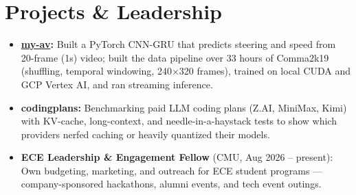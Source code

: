 \documentclass[11pt, letterpaper]{article}
\begin{document}
\section{Projects \& Leadership}
\begin{itemize}
  \item \textbf{\href{https://github.com/lordphone/my-av}{my-av}:} Built a PyTorch CNN-GRU that predicts steering and speed from 20-frame (1s) video; built the data pipeline over 33 hours of Comma2k19 (shuffling, temporal windowing, 240$\times$320 frames), trained on local CUDA and GCP Vertex AI, and ran streaming inference.
  \item \textbf{codingplans:} Benchmarking paid LLM coding plans (Z.AI, MiniMax, Kimi) with KV-cache, long-context, and needle-in-a-haystack tests to show which providers nerfed caching or heavily quantized their models.
  \item \textbf{ECE Leadership \& Engagement Fellow} (CMU, Aug 2026 -- present): Own budgeting, marketing, and outreach for ECE student programs --- company-sponsored hackathons, alumni events, and tech event outings.
\end{itemize}
\end{document}
